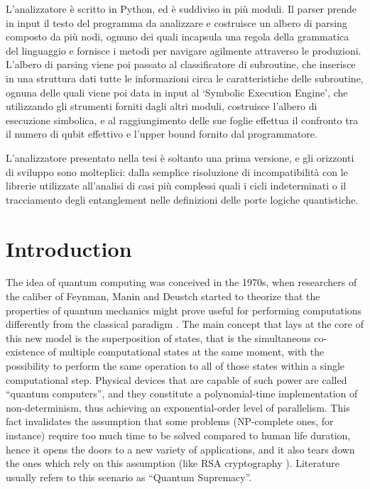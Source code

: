 \documentclass[12pt,a4paper]{report}
\theoremstyle{definition}
\theoremstyle{definition}
\theoremstyle{definition}
\begin{document}
L'analizzatore è scritto in Python, ed è suddiviso in più moduli. Il parser prende in input il testo del programma da analizzare e costruisce un albero di parsing composto da più nodi, ognuno dei quali incapsula una regola della grammatica del linguaggio e fornisce i metodi per navigare agilmente attraverso le produzioni. L'albero di parsing viene poi passato al classificatore di subroutine, che inserisce in una struttura dati tutte le informazioni circa le caratteristiche delle subroutine, ognuna delle quali viene poi data in input al `Symbolic Execution Engine', che utilizzando gli strumenti forniti dagli altri moduli, costruisce l'albero di esecuzione simbolica, e al raggiungimento delle sue foglie effettua il confronto tra il numero di qubit effettivo e l'upper bound fornito dal programmatore.

L'analizzatore presentato nella tesi è soltanto una prima versione, e gli orizzonti di sviluppo sono molteplici: dalla semplice risoluzione di incompatibilità con le librerie utilizzate all'analisi di casi più complessi quali i cicli indeterminati o il tracciamento degli entanglement nelle definizioni delle porte logiche quantistiche.








\tableofcontents



\chapter{Introduction}
\par The idea of quantum computing was conceived in the 1970s, when researchers of the caliber of Feynman, Manin and Deustch started to theorize that the properties of quantum mechanics might prove useful for performing computations differently from the classical paradigm \cite{zuw}. The main concept that lays at the core of this new model is the superposition of states, that is the simultaneous co-existence of multiple computational states at the same moment, with the possibility to perform the same operation to all of those states within a single computational step. Physical devices that are capable of such power are called ``quantum computers'', and they constitute a polynomial-time implementation of non-determinism, thus achieving an exponential-order level of parallelism. This fact invalidates the assumption that some problems (NP-complete ones, for instance) require too much time to be solved compared to human life duration, hence it opens the doors to a new variety of applications, and it also tears down the ones which rely on this assumption (like RSA cryptography \cite{denning2019quantum}). Literature usually refers to this scenario as ``Quantum Supremacy''.
\end{document}
